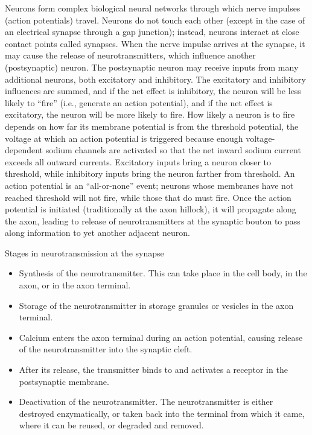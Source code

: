 Neurons form complex biological neural networks through which nerve impulses (action potentials) travel. Neurons do not touch each other (except in the case of an electrical synapse through a gap junction); instead, neurons interact at close contact points called synapses. When the nerve impulse arrives at the synapse, it may cause the release of neurotransmitters, which influence another (postsynaptic) neuron. The postsynaptic neuron may receive inputs from many additional neurons, both excitatory and inhibitory. The excitatory and inhibitory influences are summed, and if the net effect is inhibitory, the neuron will be less likely to ``fire'' (i.e., generate an action potential), and if the net effect is excitatory, the neuron will be more likely to fire. How likely a neuron is to fire depends on how far its membrane potential is from the threshold potential, the voltage at which an action potential is triggered because enough voltage-dependent sodium channels are activated so that the net inward sodium current exceeds all outward currents. Excitatory inputs bring a neuron closer to threshold, while inhibitory inputs bring the neuron farther from threshold. An action potential is an ``all-or-none'' event; neurons whose membranes have not reached threshold will not fire, while those that do must fire. Once the action potential is initiated (traditionally at the axon hillock), it will propagate along the axon, leading to release of neurotransmitters at the synaptic bouton to pass along information to yet another adjacent neuron.

Stages in neurotransmission at the synapse

\begin{itemize}
\tightlist
\item
  Synthesis of the neurotransmitter. This can take place in the cell body, in the axon, or in the axon terminal.
\item
  Storage of the neurotransmitter in storage granules or vesicles in the axon terminal.
\item
  Calcium enters the axon terminal during an action potential, causing release of the neurotransmitter into the synaptic cleft.
\item
  After its release, the transmitter binds to and activates a receptor in the postsynaptic membrane.
\item
  Deactivation of the neurotransmitter. The neurotransmitter is either destroyed enzymatically, or taken back into the terminal from which it came, where it can be reused, or degraded and removed.
\end{itemize}

